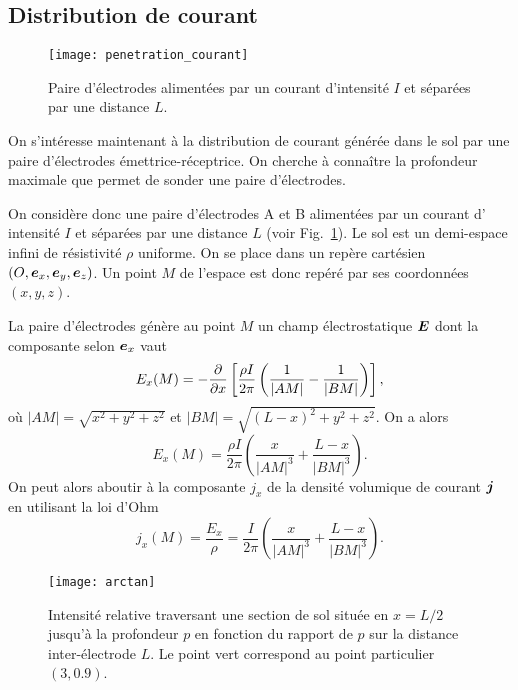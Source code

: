 \subsection{Distribution de courant}
\begin{figure}[]
	\centering
	\texttt{[image: penetration\_courant]}
	\caption{Paire d'électrodes alimentées par un courant d'intensité $I$
		 et séparées par une distance $L$.}%
	\label{fig:penetration_courant}
\end{figure}
On s'intéresse maintenant à la distribution de courant générée dans le sol
par une paire d'électrodes émettrice-réceptrice. On cherche à connaître la 
profondeur maximale que permet de sonder une paire d'électrodes. 

On considère donc une paire d'électrodes A et B alimentées par un courant d'
intensité $I$ et séparées 
par une distance $L$ (voir Fig.~\ref{fig:penetration_courant}). 
Le sol est un demi-espace infini de résistivité $\rho$ uniforme. 
On se place dans un repère cartésien $(O, \ex, \ey, \ez)$. Un point $M$ de l'espace
est donc repéré par ses coordonnées $(x, y, z)$.

La paire d'électrodes génère au point $M$ un champ électrostatique $\vece$ dont
la composante selon $\ex$ vaut
\begin{equation*}
	E_x(M) = - \dfrac{\partial}{\partial x}\left[\dfrac{\rho I}{2 \pi} 
	\left( \dfrac{1}{|AM|} - \dfrac{1}{|BM|}\right)\right],
\end{equation*}
où $|AM| = \sqrt{x^2 + y^2 + z^2}$ et $|BM| = \sqrt{(L - x)^2 + y^2 + z^2}$.
On a alors
\begin{equation*}
	E_x(M) = \dfrac{\rho I}{2 \pi}\left(\dfrac{x}{|AM|^3} 
	    + \dfrac{L - x}{|BM|^3}\right).
\end{equation*}
On peut alors aboutir à la composante $j_x$ de la densité volumique de courant
$\vecj$ en utilisant la loi d'Ohm
\begin{equation}
	j_x(M) = \dfrac{E_x}{\rho} = \dfrac{I}{2 \pi}\left(\dfrac{x}{|AM|^3} 
	    + \dfrac{L - x}{|BM|^3}\right).
\end{equation}

\begin{figure}[]
	\centering
	\texttt{[image: arctan]}
	\caption{Intensité relative traversant une section de sol située 
		en $x = L/2$ jusqu'à la profondeur
	$p$ en fonction du rapport de $p$ sur la distance inter-électrode $L$.
	Le point vert correspond au point particulier $(3, 0.9)$.}%
	\label{fig:arctan}
\end{figure}

